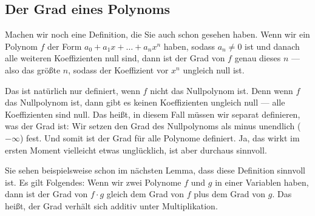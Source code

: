 \subsection{Der Grad eines Polynoms}

\begin{spoken-clean}[00:10:45 - 00:12:44]
Machen wir noch eine Definition, die Sie auch schon gesehen haben. Wenn wir ein Polynom $f$ der Form $a_0 + a_1 x + \dots + a_n x^n$ haben, sodass $a_n \neq 0$ ist und danach alle weiteren Koeffizienten null sind, dann ist der Grad von $f$ genau dieses $n$ --- also das größte $n$, sodass der Koeffizient vor $x^n$ ungleich null ist. 

Das ist natürlich nur definiert, wenn $f$ nicht das Nullpolynom ist. Denn wenn $f$ das Nullpolynom ist, dann gibt es keinen Koeffizienten ungleich null --- alle Koeffizienten sind null. Das heißt, in diesem Fall müssen wir separat definieren, was der Grad ist: Wir setzen den Grad des Nullpolynoms als minus unendlich ($-\infty$) fest. Und somit ist der Grad für alle Polynome definiert. Ja, das wirkt im ersten Moment vielleicht etwas unglücklich, ist aber durchaus sinnvoll.
\end{spoken-clean}

\begin{math-stroke}
\end{math-stroke}

\begin{spoken-clean}[00:12:44 - 00:13:35]
Sie sehen beispielsweise schon im nächsten Lemma, dass diese Definition sinnvoll ist. Es gilt Folgendes: Wenn wir zwei Polynome $f$ und $g$ in einer Variablen haben, dann ist der Grad von $f \cdot g$ gleich dem Grad von $f$ plus dem Grad von $g$. Das heißt, der Grad verhält sich additiv unter Multiplikation.
\end{spoken-clean}

